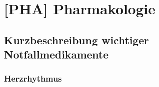 \chapter{[PHA] Pharmakologie}
\label{chp:PHA}


\minitoc






\section{Kurzbeschreibung wichtiger Notfallmedikamente}


\subsection{Herzrhythmus}
% 
